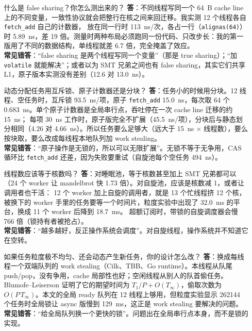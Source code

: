 \documentclass[11pt,a4paper]{ctexart}
\begin{document}
\begin{iqbox}{什么是 false sharing？你怎么测出来的？}
\textbf{答}：不同线程写同一个 64~B cache line 上的不同变量，一致性协议就会把整行在核之间来回迁移。我实测 12 个线程各自 \texttt{fetch\_\allowbreak{}add} 自己的计数器，
放在同一行时 113~ns/次，各占一行（\texttt{alignas(64)}）时 5.89~ns，差 19 倍。测量时两种布局必须跑同一份代码、只改步长：我的第一版用了不同的数据结构，单线程就差 6.7 倍，完全掩盖了效应。\\
\textbf{常见错答}：``false sharing 是两个线程写同一个变量''（那是 true sharing）；``加 \texttt{volatile} 就能解决''；或者以为 SMT 兄弟之间也有 false sharing，其实它们共享 L1，原子版本实测没有差别（12.6 对 13.0~ns）。
\end{iqbox}

\begin{iqbox}{动态分配任务用互斥锁、原子计数器还是分块？}
\textbf{答}：任务小的时候用分块。12 线程、空任务时，互斥锁 93.5~ns/项，原子 \texttt{fetch\_\allowbreak{}add} 15.0~ns，每次取 64 个 0.683~ns。单个原子计数器是全局串行点，吞吐停在一次 cache line 迁移的约 15~ns；
每项 30~ns 工作时，原子版完全不扩展（45.5~ns/项），分块后与静态划分相同（4.26 对 4.66~ns）。所以任务要么足够大（远大于 15~ns × 线程数），要么按块取，要么改成每线程本地队列加 work stealing。\\
\textbf{常见错答}：``原子操作是无锁的，所以可以无限扩展''。无锁不等于无争用，CAS 循环比 \texttt{fetch\_\allowbreak{}add} 还差，因为失败要重试（自旋池每个空任务 494~ns）。
\end{iqbox}

\begin{iqbox}{线程数应该等于核数吗？}
\textbf{答}：对睡眠池，等于核数甚至加上 SMT 兄弟都可以（24 个 worker 让 mandelbrot 快 1.73 倍）。对自旋池，应该是核数减 1，或者让调用者也干活：
12 个 worker 加上自旋的调用者，就是 13 个忙线程挤 12 个核，被换下的 worker 手里的任务要等一个时间片，粒度实验中出现了 32.0~ms 的平台，换成 11 个 worker 后降到 18.7~ms。
超额订阅时，带锁的自旋调度器会慢 766 倍（锁持有者被抢占）。\\
\textbf{常见错答}：``越多越好，反正操作系统会调度''。对自旋线程，操作系统并不知道它在空转。
\end{iqbox}

\begin{iqbox}{如果任务粒度极不均匀、还会动态产生新任务，你的设计怎么改？}
\textbf{答}：换成每线程一个双端队列的 work stealing（Cilk、TBB、Go runtime）。本线程从队尾 push/pop，没有争用，cache 局部性也好；空闲线程从别人的队首偷任务。
Blumofe--Leiserson 证明了它的期望时间为 $T_1/P + O(T_\infty)$，偷取次数为 $O(P\,T_\infty)$。本文的全局 ready 队列在 12 线程上够用，但粒度实验显示 262144 个任务时全局锁让 async 版慢到 129~ms，这正是 work stealing 要解决的问题。\\
\textbf{常见错答}：``给全局队列换一个更快的锁''。问题出在全局串行点本身，而不是锁的实现。
\end{iqbox}
\end{document}
